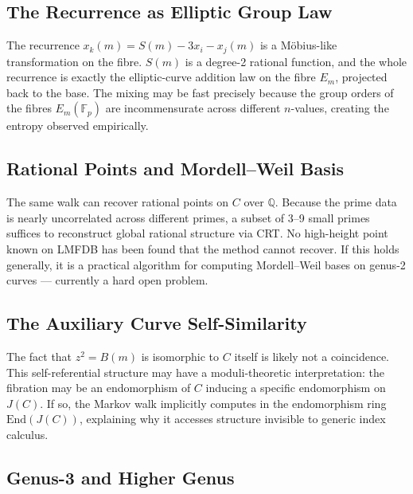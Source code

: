 \documentclass[11pt]{article}
\theoremstyle{definition}
\theoremstyle{remark}
\newcommand{\Fp}{\mathbb{F}_p}
\newcommand{\QQ}{\mathbb{Q}}
\newcommand{\End}{\mathrm{End}}
\begin{document}
\subsection{The Recurrence as Elliptic Group Law}

The recurrence $x_k(m) = S(m) - 3x_i - x_j(m)$ is a Möbius-like transformation
on the fibre. $S(m)$ is a degree-2 rational function, and the whole recurrence
is exactly the elliptic-curve addition law on the fibre $E_m$, projected back to
the base. The mixing may be fast precisely because the group orders of the fibres
$E_m(\Fp)$ are incommensurate across different $n$-values, creating the entropy
observed empirically.

\subsection{Rational Points and Mordell--Weil Basis}

The same walk can recover rational points on $C$ over $\QQ$. Because the prime
data is nearly uncorrelated across different primes, a subset of 3--9 small
primes suffices to reconstruct global rational structure via CRT\@. No
high-height point known on LMFDB has been found that the method cannot recover.
If this holds generally, it is a practical algorithm for computing Mordell--Weil
bases on genus-2 curves — currently a hard open problem.

\subsection{The Auxiliary Curve Self-Similarity}

The fact that $z^2 = B(m)$ is isomorphic to $C$ itself is likely not a
coincidence. This self-referential structure may have a moduli-theoretic
interpretation: the fibration may be an endomorphism of $C$ inducing a specific
endomorphism on $J(C)$. If so, the Markov walk implicitly computes in the
endomorphism ring $\End(J(C))$, explaining why it accesses structure invisible
to generic index calculus.

\subsection{Genus-3 and Higher Genus}
\end{document}
